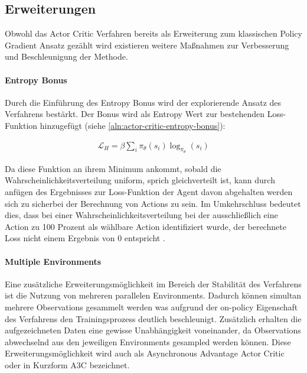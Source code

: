 \documentclass[11pt]{scrartcl}
\begin{document}
\subsection{Erweiterungen}
Obwohl das Actor Critic Verfahren bereits als Erweiterung zum klassischen Policy Gradient Ansatz
gezählt wird existieren weitere Maßnahmen zur Verbesserung und Beschleunigung der Methode.

\paragraph*{Entropy Bonus} 
\noindent
\newline
Durch die Einführung des Entropy Bonus wird der explorierende Ansatz des Verfahrens bestärkt.
Der Bonus wird als Entropy Wert zur bestehenden Loss-Funktion hinzugefügt (siehe
\ref{aln:actor-critic-entropy-bonus}):

\begin{align}
\mathcal{L}_H=\beta\sum_i\pi_\theta(s_i)\log_{\pi_\theta}(s_i)
\label{aln:actor-critic-entropy-bonus}
\end{align}

Da diese Funktion an ihrem Minimum ankommt, sobald die Wahrscheinlichkeitsverteilung uniform,
sprich gleichverteilt ist, kann durch anfügen des Ergebnisses zur Loss-Funktion der Agent davon
abgehalten werden sich \grqq zu sicher\grqq bei der Berechnung von Actions zu sein. Im
Umkehrschluss bedeutet dies, dass bei einer Wahrscheinlichkeitsverteilung bei der ausschließlich
eine Action zu 100 Prozent als wählbare Action identifiziert wurde, der berechnete Loss nicht
einem Ergebnis von 0 entspricht \cite[~S.269 f.]{L2018}.

\paragraph*{Multiple Environments} 
\label{sec:multiple_envs}
\noindent
\newline
Eine zusätzliche Erweiterungsmöglichkeit im Bereich der Stabilität des Verfahrens ist die Nutzung
von mehreren parallelen Environments. Dadurch können simultan mehrere Observations gesammelt werden
was aufgrund der on-policy Eigenschaft des Verfahrens den Trainingsprozess deutlich beschleunigt.
Zusätzlich erhalten die aufgezeichneten Daten eine gewisse Unabhängigkeit voneinander, da Observations
abwechselnd aus den jeweiligen Environments gesampled werden können. Diese Erweiterungsmöglichkeit wird
auch als Asynchronous Advantage Actor Critic oder in Kurzform A3C bezeichnet.
\end{document}
